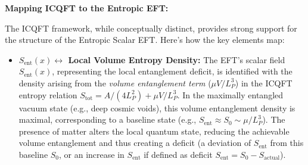 \documentclass[11pt]{article}
\begin{document}
\textbf{Mapping ICQFT to the Entropic EFT:}

The ICQFT framework, while conceptually distinct, provides strong support for the structure of the Entropic Scalar EFT. Here's how the key elements map:

\begin{itemize}
    \item \textbf{$S_{\mathrm{ent}}(x) \leftrightarrow$ Local Volume Entropy Density:} The EFT's scalar field $S_{\mathrm{ent}}(x)$, representing the local entanglement deficit, is identified with the density arising from the \emph{volume entanglement term} ($\mu V/L_P^3$) in the ICQFT entropy relation $S_{\mathrm{tot}} = A/(4L_P^2) + \mu V/L_P^3$. In the maximally entangled vacuum state (e.g., deep cosmic voids), this volume entanglement density is maximal, corresponding to a baseline state (e.g., $S_{\mathrm{ent}} \approx S_0 \sim \mu/L_P^3$). The presence of matter alters the local quantum state, reducing the achievable volume entanglement and thus creating a deficit (a deviation of $S_{\mathrm{ent}}$ from this baseline $S_0$, or an increase in $S_{\mathrm{ent}}$ if defined as deficit $S_{\mathrm{ent}}=S_0 - S_{\mathrm{actual}}$).


\end{itemize}
\end{document}

